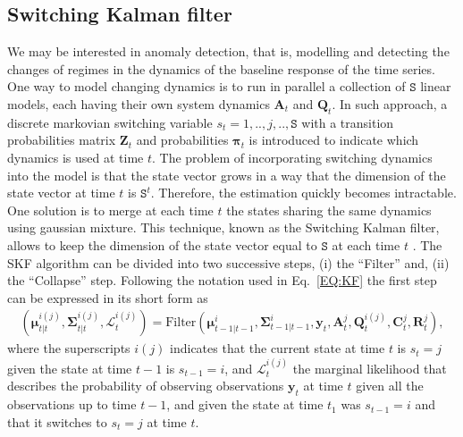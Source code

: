 \subsection{Switching Kalman filter}
\label{SS:THSKF}
We may be interested in anomaly detection, that is, modelling and detecting the changes of regimes in the dynamics of the baseline response of the time series.
One way to model changing dynamics is to run in parallel a collection of ${\mathtt{S}}$ linear models, each having their own system dynamics $\mathbf{A}_{t}$ and $ \mathbf{Q}_{t}$.
In such approach, a discrete markovian switching variable $s_{t}= 1, ..,j,.. ,\mathtt{S}$ with a transition probabilities matrix $\mathbf{Z}_{t}$ and probabilities $\bm{\pi}_{t}$ is introduced to indicate which dynamics is used at time $t$.
The problem of incorporating switching dynamics into the model is that the state vector grows in a way that the dimension of the state vector at time $t$ is $\mathtt{S}^{t}$.
Therefore, the estimation quickly becomes intractable.
One solution is to merge at each time $t$ the states sharing the same dynamics using gaussian mixture.
This technique, known as the Switching Kalman filter, allows to keep the dimension of the state vector equal to $\mathtt{S}$ at each time $t$ \cite{murphy2012machine}.
The SKF algorithm can be divided into two successive steps, (i) the ``Filter'' and, (ii) the ``Collapse'' step.
Following the notation used in Eq.~\ref{EQ:KF} the first step can be expressed in its short form as
\begin{equation}
  \begin{split}
  (\bm{\mu}_{t|t}^{i(j)},\bm{\Sigma}_{t|t}^{i(j)}, \mathcal{L}_{t}^{i(j)}) = \text{Filter}(\bm{\mu}_{t-1|t-1}^{i},\bm{\Sigma}_{t-1|t-1}^{i}, \mathbf{y}_{t}, \mathbf{A}_{t}^{j},  \mathbf{Q}_{t}^{i(j)},   \mathbf{C}^{j}_{t},  \mathbf{R}^{j}_{t}),
    \end{split}
\label{EQ:SKF1}
\end{equation}
where the superscripts $i(j)$ indicates that the current state at time $t$ is $s_{t}=j$ given the state at time $t-1$ is $s_{t-1}=i$, and
$ \mathcal{L}_{t}^{i(j)}$  the marginal likelihood that describes the probability of observing observations $\mathbf{y}_{t}$ at time $t$ given all the observations up to time $t-1$, and given the state at time $t_1$ was $s_{t-1} = i$ and that it switches to $s_{t} = j$ at time $t$.
